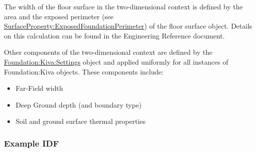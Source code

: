 The width of the floor surface in the two-dimensional context is defined
by the area and the exposed perimeter (see
\hyperref[surfaceproperty-exposedfoundationperimeter]{SurfaceProperty:ExposedFoundationPerimeter}) of the floor surface object.
Details on this calculation can be found in the Engineering Reference
document.

Other components of the two-dimensional context are defined by the
\hyperref[foundation-kiva-settings]{Foundation:Kiva:Settings} object and applied uniformly for all instances
of Foundation:Kiva objects. These components include:

\begin{itemize}
\tightlist
\item
  Far-Field width
\item
  Deep Ground depth (and boundary type)
\item
  Soil and ground surface thermal properties
\end{itemize}

\subsubsection{Example IDF}\label{example-idf}

